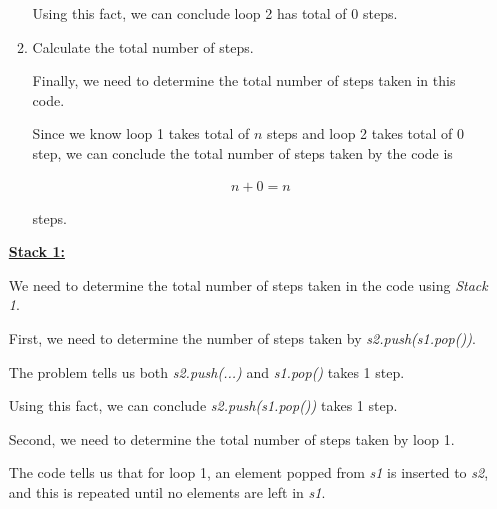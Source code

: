 \documentclass[12pt]{article}
\begin{document}
\begin{enumerate}[a.]
\begin{mdframed}
\begin{enumerate}[1.]
\begin{mdframed}
            \bigskip

            Using this fact, we can conclude loop 2 has total of 0 steps.

            \end{mdframed}

            \item Calculate the total number of steps.

            \begin{mdframed}
            Finally, we need to determine the total number of steps taken in this code.

            \bigskip

            Since we know loop 1 takes total of $n$ steps and loop 2 takes total of 0 step, we can
            conclude the total number of steps taken by the code is

            \begin{align}
                n + 0 = n
            \end{align}

            steps.

            \end{mdframed}

        \end{enumerate}

        \bigskip

        \begin{mdframed}

        \underline{\textbf{Stack 1:}}

        \bigskip

        We need to determine the total number of steps taken in the code using \textit{Stack 1}.

        \bigskip

        First, we need to determine the number of steps taken by \textit{s2.push(s1.pop())}.

        \bigskip

        The problem tells us both \textit{s2.push(...)} and \textit{s1.pop()} takes 1 step.

        \bigskip

        Using this fact, we can conclude \textit{s2.push(s1.pop())} takes 1 step.

        \bigskip

        Second, we need to determine the total number of steps taken by loop 1.

        \bigskip

        The code tells us that for loop 1, an element popped from \textit{s1} is inserted to \textit{s2},
        and this is repeated until no elements are left in \textit{s1}.


\end{mdframed}
\end{mdframed}
\end{enumerate}
\end{document}

